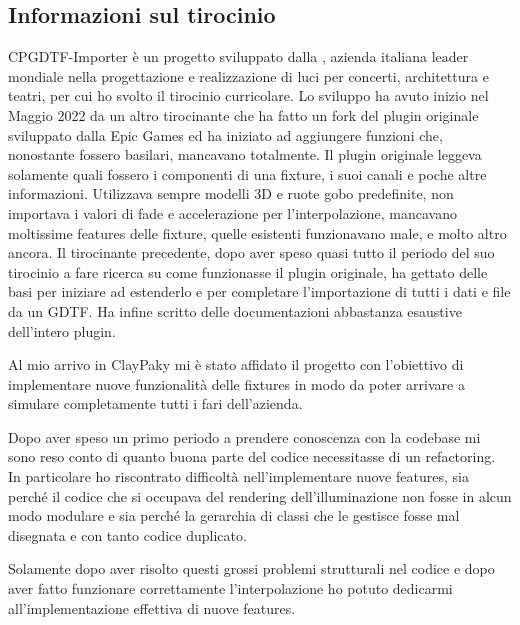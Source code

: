 \documentclass[main.tex]{subfiles}
\begin{document}
\subsection{Informazioni sul tirocinio}\label{subsec:1_tirocinio}
CPGDTF-Importer è un progetto sviluppato dalla , azienda italiana leader mondiale nella progettazione e realizzazione di luci per concerti, architettura e teatri, per cui ho svolto il tirocinio curricolare. Lo sviluppo ha avuto inizio nel Maggio 2022 da un altro tirocinante che ha fatto un fork del plugin originale sviluppato dalla Epic Games ed ha iniziato ad aggiungere funzioni che, nonostante fossero basilari, mancavano totalmente. Il plugin originale leggeva solamente quali fossero i componenti di una fixture, i suoi canali e poche altre informazioni. Utilizzava sempre modelli 3D e ruote gobo predefinite, non importava i valori di fade e accelerazione per l'interpolazione, mancavano moltissime features delle fixture, quelle esistenti funzionavano male, e molto altro ancora. Il tirocinante precedente, dopo aver speso quasi tutto il periodo del suo tirocinio a fare ricerca su come funzionasse il plugin originale, ha gettato delle basi per iniziare ad estenderlo e per completare l'importazione di tutti i dati e file da un GDTF. Ha infine scritto delle documentazioni abbastanza esaustive dell'intero plugin.\newline

Al mio arrivo in ClayPaky mi è stato affidato il progetto con l'obiettivo di implementare nuove funzionalità delle fixtures in modo da poter arrivare a simulare completamente tutti i fari dell'azienda.

Dopo aver speso un primo periodo a prendere conoscenza con la codebase mi sono reso conto di quanto buona parte del codice necessitasse di un refactoring. In particolare ho riscontrato difficoltà nell'implementare nuove features, sia perché il codice che si occupava del rendering dell'illuminazione non fosse in alcun modo modulare e sia perché la gerarchia di classi che le gestisce fosse mal disegnata e con tanto codice duplicato. 

Solamente dopo aver risolto questi grossi problemi strutturali nel codice e dopo aver fatto funzionare correttamente l'interpolazione ho potuto dedicarmi all'implementazione effettiva di nuove features. 

\end{document}
